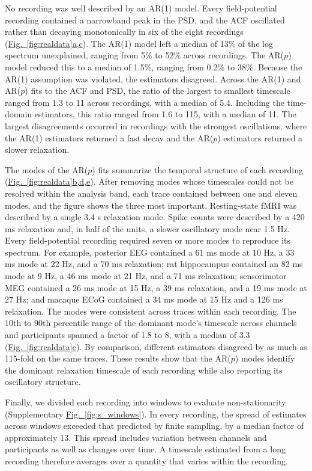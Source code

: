 \documentclass[pdflatex,lineno,sn-nature]{sn-jnl}
\newcommand{\figpanel}[3][]{\hyperref[#2]{Fig.~#1\ref*{#2}#3}}
\theoremstyle{thmstyleone}
\theoremstyle{thmstyletwo}
\theoremstyle{thmstylethree}
\begin{document}
No recording was well described by an AR(1) model. Every field-potential recording contained a narrowband peak in the PSD, and the ACF oscillated rather than decaying monotonically in six of the eight recordings (\figpanel{fig:realdata}{a,c}). The AR(1) model left a median of 13\% of the log spectrum unexplained, ranging from 5\% to 52\% across recordings. The AR($p$) model reduced this to a median of 1.5\%, ranging from 0.2\% to 38\%. Because the AR(1) assumption was violated, the estimators disagreed. Across the AR(1) and AR($p$) fits to the ACF and PSD, the ratio of the largest to smallest timescale ranged from 1.3 to 11 across recordings, with a median of 5.4. Including the time-domain estimators, this ratio ranged from 1.6 to 115, with a median of 11. The largest disagreements occurred in recordings with the strongest oscillations, where the AR(1) estimators returned a fast decay and the AR($p$) estimators returned a slower relaxation.

The modes of the AR($p$) fits summarize the temporal structure of each recording (\figpanel{fig:realdata}{b,d,e}). After removing modes whose timescales could not be resolved within the analysis band, each trace contained between one and eleven modes, and the figure shows the three most important. Resting-state fMRI was described by a single 3.4 s relaxation mode. Spike counts were described by a 420 ms relaxation and, in half of the units, a slower oscillatory mode near 1.5 Hz. Every field-potential recording required seven or more modes to reproduce its spectrum. For example, posterior EEG contained a 61 ms mode at 10 Hz, a 33 ms mode at 22 Hz, and a 70 ms relaxation; rat hippocampus contained an 82 ms mode at 9 Hz, a 46 ms mode at 21 Hz, and a 71 ms relaxation; sensorimotor MEG contained a 26 ms mode at 15 Hz, a 39 ms relaxation, and a 19 ms mode at 27 Hz; and macaque ECoG contained a 34 ms mode at 15 Hz and a 126 ms relaxation. The modes were consistent across traces within each recording. The 10th to 90th percentile range of the dominant mode's timescale across channels and participants spanned a factor of 1.8 to 8, with a median of 3.3 (\figpanel{fig:realdata}{e}). By comparison, different estimators disagreed by as much as 115-fold on the same traces. These results show that the AR($p$) modes identify the dominant relaxation timescale of each recording while also reporting its oscillatory structure.

Finally, we divided each recording into windows to evaluate non-stationarity (Supplementary \figpanel{fig:s_windows}{}). In every recording, the spread of estimates across windows exceeded that predicted by finite sampling, by a median factor of approximately 13. This spread includes variation between channels and participants as well as changes over time. A timescale estimated from a long recording therefore averages over a quantity that varies within the recording.
\end{document}

